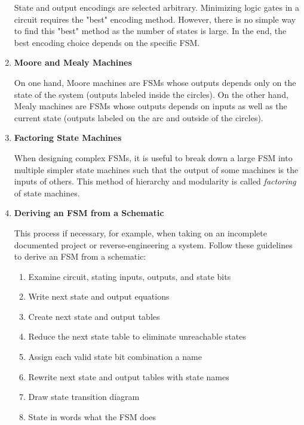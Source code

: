 \documentclass[12pt]{article}
\begin{document}
\begin{enumerate}
  State and output encodings are selected arbitrary. Minimizing logic gates in a circuit requires the "best" encoding method. However, there is no simple way to find this "best" method as the number of states is large. In the end, the best encoding choice depends on the specific FSM.

  \item \textbf{Moore and Mealy Machines}

  On one hand, Moore machines are FSMs whose outputs depends only on the state of the system (outputs labeled inside the circles). On the other hand, Mealy machines are FSMs whose outputs depends on inputs as well as the current state (outputs labeled on the arc and outside of the circles).

  \item \textbf{Factoring State Machines}

  When designing complex FSMs, it is useful to break down a large FSM into multiple simpler state machines such that the output of some machines is the inputs of others. This method of hierarchy and modularity is called \textit{factoring} of state machines.

  \item \textbf{Deriving an FSM from a Schematic}

  This process if necessary, for example, when taking on an incomplete documented project or reverse-engineering a system. Follow these guidelines to derive an FSM from a schematic:

  \begin{enumerate}
    \item Examine circuit, stating inputs, outputs, and state bits
    \item Write next state and output equations
    \item Create next state and output tables
    \item Reduce the next state table to eliminate unreachable states
    \item Assign each valid state bit combination a name
    \item Rewrite next state and output tables with state names
    \item Draw state transition diagram
    \item State in words what the FSM does
  \end{enumerate}


\end{enumerate}
\end{document}
